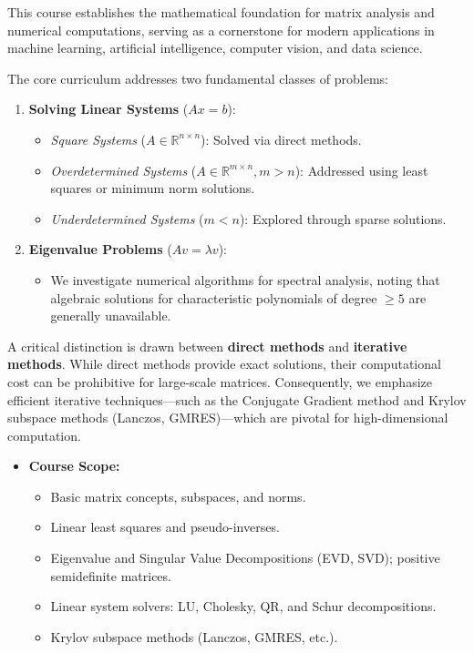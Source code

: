 \documentclass[11pt, a4paper]{report}
\begin{document}
\begin{tcolorbox}[
    enhanced,
    title=\textbf{Course Information},
    colframe=TopicColor,
    colback=TopicBg,
    coltitle=white,
    boxrule=0.5pt,
    leftrule=2pt,
    sharp corners=downhill,
    drop shadow=black!5!white
]
    This course establishes the mathematical foundation for matrix analysis and numerical computations, serving as a cornerstone for modern applications in machine learning, artificial intelligence, computer vision, and data science.
    
    The core curriculum addresses two fundamental classes of problems:
    \begin{enumerate}
        \item \textbf{Solving Linear Systems} ($Ax=b$):
        \begin{itemize}
            \item \textit{Square Systems} ($A \in \mathbb{R}^{n \times n}$): Solved via direct methods.
            \item \textit{Overdetermined Systems} ($A \in \mathbb{R}^{m \times n}, m > n$): Addressed using least squares or minimum norm solutions.
            \item \textit{Underdetermined Systems} ($m < n$): Explored through sparse solutions.
        \end{itemize}
        
        \item \textbf{Eigenvalue Problems} ($Av = \lambda v$):
        \begin{itemize}
            \item We investigate numerical algorithms for spectral analysis, noting that algebraic solutions for characteristic polynomials of degree $\ge 5$ are generally unavailable.
        \end{itemize}
    \end{enumerate}

    A critical distinction is drawn between \textbf{direct methods} and \textbf{iterative methods}. While direct methods provide exact solutions, their computational cost can be prohibitive for large-scale matrices. Consequently, we emphasize efficient iterative techniques---such as the Conjugate Gradient method and Krylov subspace methods (Lanczos, GMRES)---which are pivotal for high-dimensional computation.
\end{tcolorbox}

\begin{itemize}
    \item \textbf{Course Scope:}
    \begin{itemize}
        \item Basic matrix concepts, subspaces, and norms.
        \item Linear least squares and pseudo-inverses.
        \item Eigenvalue and Singular Value Decompositions (EVD, SVD); positive semidefinite matrices.
        \item Linear system solvers: LU, Cholesky, QR, and Schur decompositions.
        \item Krylov subspace methods (Lanczos, GMRES, etc.).
    \end{itemize}
\end{itemize}
\end{document}
